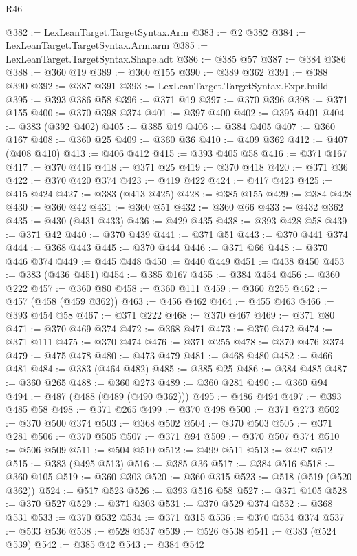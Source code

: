 \begin{lexlean}{R46}
\begin{coremodule}
@382 := LexLeanTarget.TargetSyntax.Arm
@383 := @2 @382
@384 := LexLeanTarget.TargetSyntax.Arm.arm
@385 := LexLeanTarget.TargetSyntax.Shape.adt
@386 := @385 @57
@387 := @384 @386
@388 := @360 @19
@389 := @360 @155
@390 := @389 @362
@391 := @388 @390
@392 := @387 @391
@393 := LexLeanTarget.TargetSyntax.Expr.build
@395 := @393 @386 @58
@396 := @371 @19
@397 := @370 @396
@398 := @371 @155
@400 := @370 @398 @374
@401 := @397 @400
@402 := @395 @401
@404 := @383 (@392 @402)
@405 := @385 @19
@406 := @384 @405
@407 := @360 @167
@408 := @360 @25
@409 := @360 @36
@410 := @409 @362
@412 := @407 (@408 @410)
@413 := @406 @412
@415 := @393 @405 @58
@416 := @371 @167
@417 := @370 @416
@418 := @371 @25
@419 := @370 @418
@420 := @371 @36
@422 := @370 @420 @374
@423 := @419 @422
@424 := @417 @423
@425 := @415 @424
@427 := @383 (@413 @425)
@428 := @385 @155
@429 := @384 @428
@430 := @360 @42
@431 := @360 @51
@432 := @360 @66
@433 := @432 @362
@435 := @430 (@431 @433)
@436 := @429 @435
@438 := @393 @428 @58
@439 := @371 @42
@440 := @370 @439
@441 := @371 @51
@443 := @370 @441 @374
@444 := @368 @443
@445 := @370 @444
@446 := @371 @66
@448 := @370 @446 @374
@449 := @445 @448
@450 := @440 @449
@451 := @438 @450
@453 := @383 (@436 @451)
@454 := @385 @167
@455 := @384 @454
@456 := @360 @222
@457 := @360 @80
@458 := @360 @111
@459 := @360 @255
@462 := @457 (@458 (@459 @362))
@463 := @456 @462
@464 := @455 @463
@466 := @393 @454 @58
@467 := @371 @222
@468 := @370 @467
@469 := @371 @80
@471 := @370 @469 @374
@472 := @368 @471
@473 := @370 @472
@474 := @371 @111
@475 := @370 @474
@476 := @371 @255
@478 := @370 @476 @374
@479 := @475 @478
@480 := @473 @479
@481 := @468 @480
@482 := @466 @481
@484 := @383 (@464 @482)
@485 := @385 @25
@486 := @384 @485
@487 := @360 @265
@488 := @360 @273
@489 := @360 @281
@490 := @360 @94
@494 := @487 (@488 (@489 (@490 @362)))
@495 := @486 @494
@497 := @393 @485 @58
@498 := @371 @265
@499 := @370 @498
@500 := @371 @273
@502 := @370 @500 @374
@503 := @368 @502
@504 := @370 @503
@505 := @371 @281
@506 := @370 @505
@507 := @371 @94
@509 := @370 @507 @374
@510 := @506 @509
@511 := @504 @510
@512 := @499 @511
@513 := @497 @512
@515 := @383 (@495 @513)
@516 := @385 @36
@517 := @384 @516
@518 := @360 @105
@519 := @360 @303
@520 := @360 @315
@523 := @518 (@519 (@520 @362))
@524 := @517 @523
@526 := @393 @516 @58
@527 := @371 @105
@528 := @370 @527
@529 := @371 @303
@531 := @370 @529 @374
@532 := @368 @531
@533 := @370 @532
@534 := @371 @315
@536 := @370 @534 @374
@537 := @533 @536
@538 := @528 @537
@539 := @526 @538
@541 := @383 (@524 @539)
@542 := @385 @42
@543 := @384 @542

\end{coremodule}
\end{lexlean}
